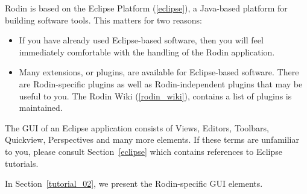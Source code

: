 Rodin is based on the Eclipse Platform (\ref{eclipse}), a Java-based platform for building software tools.  This matters for two reasons:
\begin{itemize}
	\item If you have already used Eclipse-based software, then you will feel immediately comfortable with the handling of the Rodin application.
	\item Many extensions, or plugins, are available for Eclipse-based software. There are Rodin-specific plugins as well as Rodin-independent plugins that may be useful to you.  The Rodin Wiki (\ref{rodin_wiki}), contains a list of plugins is maintained.
\end{itemize}

The GUI of an Eclipse application consists of Views, Editors, Toolbars, Quickview, Perspectives and many more elements.  If these terms are unfamiliar to you, please consult Section~\ref{eclipse} which contains references to Eclipse tutorials.

In Section~\ref{tutorial_02}, we present the Rodin-specific GUI elements.
